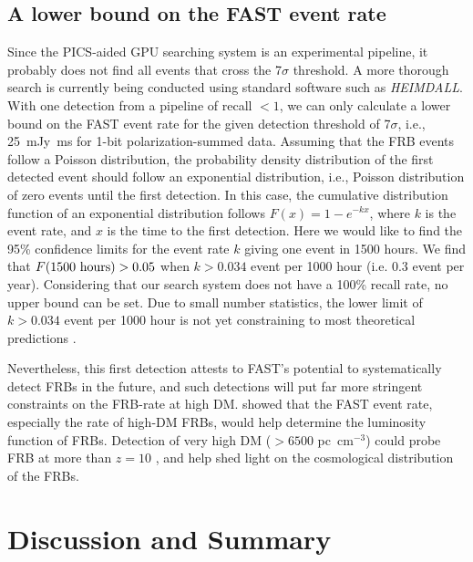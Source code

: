 \subsection{A lower bound on the FAST event rate}
Since the PICS-aided GPU searching system is an experimental pipeline, it probably does not find all events that cross the 7$\sigma$ threshold. A more thorough search is currently being conducted using standard software such as {\it HEIMDALL}.
With one detection from a pipeline of recall $<1$, we can only calculate a lower bound on the FAST event rate for the given detection threshold of 7$\sigma$, i.e., 25~mJy~ms for 1-bit polarization-summed data. 
Assuming that the FRB events follow a Poisson distribution, the probability density distribution of the first detected event should follow an exponential distribution, i.e., Poisson distribution of zero events until the first detection. 
In this case, the cumulative distribution function of an exponential
distribution follows $F(x) =1 - e^{-k x} $, where $k$ is the
event rate, and $x$ is the time to the first detection. 
Here we would like to find the 95\% confidence limits for the event rate
$k$ giving one event in 1500 hours. We find that $F(1500\ \rm hours) > 0.05$ when $k > 0.034$ event per 1000 hour (i.e. 0.3 event per year).
Considering that our search system does not have a 100\% recall rate, no upper bound can be set. 
Due to small number statistics, the lower limit of $k > 0.034 $ event per 1000 hour is not yet constraining to most theoretical predictions \citep{lhz+17, lllz18, lml+20}. 

Nevertheless, this first detection attests to FAST's potential to systematically detect FRBs in the future, and such detections will put far more stringent constraints on the FRB-rate at high DM.
\citet{lor18,zhang18} showed that the FAST event rate, especially the rate of high-DM FRBs, would help determine the luminosity function of FRBs.
Detection of very high DM ($> 6500$ pc~cm$^{-3}$) could probe FRB at more than $z=10$ \citep{zhang18}, and help shed light on the cosmological distribution of the FRBs.

\section{Discussion and Summary}

